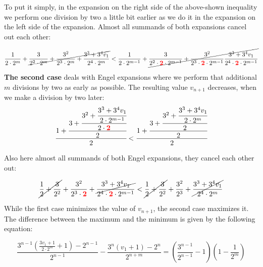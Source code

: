 \documentclass[12pt]{amsart}
\theoremstyle{definition}
\begin{document}
\par\bigskip
To put it simply, in the expansion on the right side of the above-shown inequality we perform one division by two a little bit earlier as we do it in the expansion on the left side of the expansion. Almost all summands of both expansions cancel out each other:

\[
\frac{1}{2\cdot2^m}+\cancel{\frac{3}{2^2\cdot2^m}+\frac{3^2}{2^3\cdot2^m}+\frac{3^3+3^4v_1}{2^4\cdot2^m}}
<
\frac{1}{2\cdot2^{m-1}}+\cancel{\frac{3}{2^2\cdot\textcolor{red}{\mathbf{2}}\cdot2^{m-1}}+\frac{3^2}{2^3\cdot\textcolor{red}{\mathbf{2}}\cdot2^{m-1}}\frac{3^3+3^4v_1}{2^4\cdot\textcolor{red}{\mathbf{2}}\cdot2^{m-1}}}
\]

\par\medskip\noindent
\textbf{The second case} deals with Engel expansions where we perform that additional $m$ divisions by two as early as possible. The resulting value $v_{n+1}$ decreases, when we make a division by two later:
\[
\cfrac{1+\cfrac{3+\cfrac{3^2+\cfrac{3^3+3^4v_1}{2\cdot2^{m-1}}}{2\cdot\textcolor{red}{\mathbf{2}}}}{2}}{2}
<
\cfrac{1+\cfrac{3+\cfrac{3^2+\cfrac{3^3+3^4v_1}{2\cdot2^m}}{2}}{2}}{2}
\]

\par\bigskip
Also here almost all summands of both Engel expansions, they cancel each other out:

\[
\cancel{\frac{1}{2}+\frac{3}{2^2}}+\frac{3^2}{2^3\cdot\textcolor{red}{\mathbf{2}}}+\cancel{\frac{3^3+3^4v_1}{2^4\cdot\textcolor{red}{\mathbf{2}}\cdot2^{m-1}}}
<
\cancel{\frac{1}{2}+\frac{3}{2^2}}+\frac{3^2}{2^3}+\cancel{\frac{3^3+3^4v_1}{2^4\cdot2^m}}
\]

\par\bigskip
While the first case minimizes the value of $v_{n+1}$, the second case maximizes it. The difference between the maximum and the minimum is given by the following equation:

\[
\frac{3^{n-1}\left(\frac{3v_1+1}{2\cdot2^m}+1\right)-2^{n-1}}{2^{n-1}}-\frac{3^n\left(v_1+1\right)-2^n}{2^{n+m}}=\left(\frac{3^{n-1}}{2^{n-1}}-1\right)\left(1-\frac{1}{2^m}\right)
\]
\end{document}
